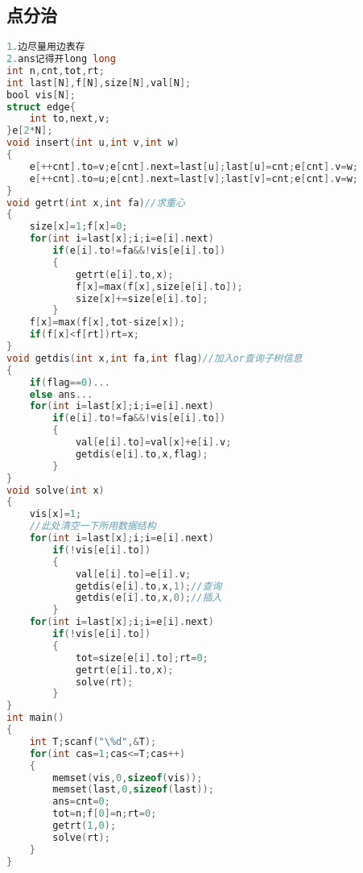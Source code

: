 \subsection{点分治}
\begin{lstlisting}[language=C]
1.边尽量用边表存
2.ans记得开long long
int n,cnt,tot,rt;
int last[N],f[N],size[N],val[N];
bool vis[N];
struct edge{
	int to,next,v;
}e[2*N];
void insert(int u,int v,int w)
{
    e[++cnt].to=v;e[cnt].next=last[u];last[u]=cnt;e[cnt].v=w;
    e[++cnt].to=u;e[cnt].next=last[v];last[v]=cnt;e[cnt].v=w;
}
void getrt(int x,int fa)//求重心
{
    size[x]=1;f[x]=0;
    for(int i=last[x];i;i=e[i].next)
        if(e[i].to!=fa&&!vis[e[i].to])
        {
            getrt(e[i].to,x);
            f[x]=max(f[x],size[e[i].to]);
            size[x]+=size[e[i].to];
        }
    f[x]=max(f[x],tot-size[x]);
    if(f[x]<f[rt])rt=x;
}
void getdis(int x,int fa,int flag)//加入or查询子树信息
{
    if(flag==0)...
    else ans...
    for(int i=last[x];i;i=e[i].next)
        if(e[i].to!=fa&&!vis[e[i].to])
        {
        	val[e[i].to]=val[x]+e[i].v;
            getdis(e[i].to,x,flag);
        }
}
void solve(int x)
{
	vis[x]=1;
	//此处清空一下所用数据结构
	for(int i=last[x];i;i=e[i].next)
		if(!vis[e[i].to])
		{
			val[e[i].to]=e[i].v;
			getdis(e[i].to,x,1);//查询
			getdis(e[i].to,x,0);//插入
		}
	for(int i=last[x];i;i=e[i].next)
		if(!vis[e[i].to])
		{
			tot=size[e[i].to];rt=0;
			getrt(e[i].to,x);
			solve(rt);
		}
}
int main()
{
	int T;scanf("\%d",&T);
	for(int cas=1;cas<=T;cas++)
	{
		memset(vis,0,sizeof(vis));
        memset(last,0,sizeof(last));
        ans=cnt=0;
		tot=n;f[0]=n;rt=0;
		getrt(1,0);
		solve(rt);
	}
}
\end{lstlisting}
